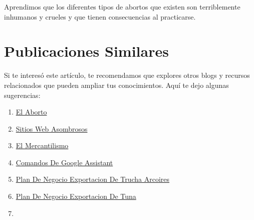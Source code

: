 \documentclass[
  jou,
  floatsintext,
  longtable,
  a4paper,
  nolmodern,
  notxfonts,
  notimes,
  colorlinks=true,linkcolor=blue,citecolor=blue,urlcolor=blue]{apa7}
\providecommand{\tightlist}{%
  \setlength{\itemsep}{0pt}\setlength{\parskip}{0pt}}
\begin{document}
Aprendimos que los diferentes tipos de abortos que existen son
terriblemente inhumanos y crueles y que tienen consecuencias al
practicarse.

\section{Publicaciones Similares}\label{publicaciones-similares}

Si te interesó este artículo, te recomendamos que explores otros blogs y
recursos relacionados que pueden ampliar tus conocimientos. Aquí te dejo
algunas sugerencias:

\begin{enumerate}
\def\labelenumi{\arabic{enumi}.}
\tightlist
\item
  \href{https://achalmaedison.netlify.app/blog/posts/2015-05-14-el-aborto/index.pdf}{}
  \href{https://achalmaedison.netlify.app/blog/posts/2015-05-14-el-aborto}{El
  Aborto}
\item
  \href{https://achalmaedison.netlify.app/blog/posts/2017-04-23-sitios-web-asombrosos/index.pdf}{}
  \href{https://achalmaedison.netlify.app/blog/posts/2017-04-23-sitios-web-asombrosos}{Sitios
  Web Asombrosos}
\item
  \href{https://achalmaedison.netlify.app/blog/posts/2017-05-23-el-mercantilismo/index.pdf}{}
  \href{https://achalmaedison.netlify.app/blog/posts/2017-05-23-el-mercantilismo}{El
  Mercantilismo}
\item
  \href{https://achalmaedison.netlify.app/blog/posts/2020-05-23-comandos-de-google-assistant/index.pdf}{}
  \href{https://achalmaedison.netlify.app/blog/posts/2020-05-23-comandos-de-google-assistant}{Comandos
  De Google Assistant}
\item
  \href{https://achalmaedison.netlify.app/blog/posts/2020-09-15-plan-de-negocio-exportacion-de-trucha-arcoires/index.pdf}{}
  \href{https://achalmaedison.netlify.app/blog/posts/2020-09-15-plan-de-negocio-exportacion-de-trucha-arcoires}{Plan
  De Negocio Exportacion De Trucha Arcoires}
\item
  \href{https://achalmaedison.netlify.app/blog/posts/2021-07-13-plan-de-negocio-exportacion-de-tuna/index.pdf}{}
  \href{https://achalmaedison.netlify.app/blog/posts/2021-07-13-plan-de-negocio-exportacion-de-tuna}{Plan
  De Negocio Exportacion De Tuna}
\item
  \href{https://achalmaedison.netlify.app/blog/posts/2021-07-14-comandos-de-blogdown/index.pdf}{}

\end{enumerate}
\end{document}
